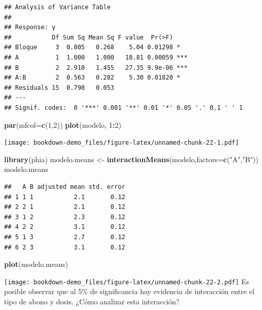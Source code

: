 \documentclass[]{book}
\newenvironment{Shaded}{\begin{snugshade}}{\end{snugshade}}
\newcommand{\KeywordTok}[1]{\textcolor[rgb]{0.13,0.29,0.53}{\textbf{#1}}}
\newcommand{\DataTypeTok}[1]{\textcolor[rgb]{0.13,0.29,0.53}{#1}}
\newcommand{\DecValTok}[1]{\textcolor[rgb]{0.00,0.00,0.81}{#1}}
\newcommand{\StringTok}[1]{\textcolor[rgb]{0.31,0.60,0.02}{#1}}
\newcommand{\OperatorTok}[1]{\textcolor[rgb]{0.81,0.36,0.00}{\textbf{#1}}}
\newcommand{\NormalTok}[1]{#1}
\begin{document}
\begin{verbatim}
## Analysis of Variance Table
## 
## Response: y
##           Df Sum Sq Mean Sq F value  Pr(>F)    
## Bloque     3  0.805   0.268    5.04 0.01298 *  
## A          1  1.000   1.000   18.81 0.00059 ***
## B          2  2.910   1.455   27.35 9.9e-06 ***
## A:B        2  0.563   0.282    5.30 0.01820 *  
## Residuals 15  0.798   0.053                    
## ---
## Signif. codes:  0 '***' 0.001 '**' 0.01 '*' 0.05 '.' 0.1 ' ' 1
\end{verbatim}

\begin{Shaded}
\begin{Highlighting}[]
\KeywordTok{par}\NormalTok{(}\DataTypeTok{mfcol=}\KeywordTok{c}\NormalTok{(}\DecValTok{1}\NormalTok{,}\DecValTok{2}\NormalTok{))}
\KeywordTok{plot}\NormalTok{(modelo, }\DecValTok{1}\OperatorTok{:}\DecValTok{2}\NormalTok{)}
\end{Highlighting}
\end{Shaded}

\texttt{[image: bookdown-demo\_files/figure-latex/unnamed-chunk-22-1.pdf]}

\begin{Shaded}
\begin{Highlighting}[]
\KeywordTok{library}\NormalTok{(phia)}
\NormalTok{modelo.means <-}\StringTok{ }\KeywordTok{interactionMeans}\NormalTok{(modelo,}\DataTypeTok{factors=}\KeywordTok{c}\NormalTok{(}\StringTok{"A"}\NormalTok{,}\StringTok{"B"}\NormalTok{))}
\NormalTok{modelo.means}
\end{Highlighting}
\end{Shaded}

\begin{verbatim}
##   A B adjusted mean std. error
## 1 1 1           2.1       0.12
## 2 2 1           2.1       0.12
## 3 1 2           2.3       0.12
## 4 2 2           3.1       0.12
## 5 1 3           2.7       0.12
## 6 2 3           3.1       0.12
\end{verbatim}

\begin{Shaded}
\begin{Highlighting}[]
\KeywordTok{plot}\NormalTok{(modelo.means)}
\end{Highlighting}
\end{Shaded}

\texttt{[image: bookdown-demo\_files/figure-latex/unnamed-chunk-22-2.pdf]}
Es posible observar que al 5\% de significancia hay evidencia de
interacción entre el tipo de abono y dosis. ¿Cómo analizar esta
interacción?
\end{document}

